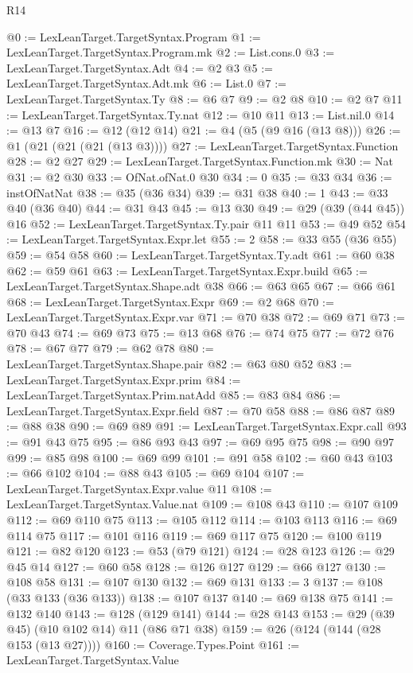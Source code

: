 \begin{lexlean}{R14}
\begin{coremodule}
{{{{{{{{{{{{@0 := LexLeanTarget.TargetSyntax.Program
@1 := LexLeanTarget.TargetSyntax.Program.mk
@2 := List.cons.{0}
@3 := LexLeanTarget.TargetSyntax.Adt
@4 := @2 @3
@5 := LexLeanTarget.TargetSyntax.Adt.mk
@6 := List.{0}
@7 := LexLeanTarget.TargetSyntax.Ty
@8 := @6 @7
@9 := @2 @8
@10 := @2 @7
@11 := LexLeanTarget.TargetSyntax.Ty.nat
@12 := @10 @11
@13 := List.nil.{0}
@14 := @13 @7
@16 := @12 (@12 @14)
@21 := @4 (@5 (@9 @16 (@13 @8)))
@26 := @1 (@21 (@21 (@21 (@13 @3))))
@27 := LexLeanTarget.TargetSyntax.Function
@28 := @2 @27
@29 := LexLeanTarget.TargetSyntax.Function.mk
@30 := Nat
@31 := @2 @30
@33 := OfNat.ofNat.{0} @30
@34 := 0
@35 := @33 @34
@36 := instOfNatNat
@38 := @35 (@36 @34)
@39 := @31 @38
@40 := 1
@43 := @33 @40 (@36 @40)
@44 := @31 @43
@45 := @13 @30
@49 := @29 (@39 (@44 @45)) @16
@52 := LexLeanTarget.TargetSyntax.Ty.pair @11 @11
@53 := @49 @52
@54 := LexLeanTarget.TargetSyntax.Expr.let
@55 := 2
@58 := @33 @55 (@36 @55)
@59 := @54 @58
@60 := LexLeanTarget.TargetSyntax.Ty.adt
@61 := @60 @38
@62 := @59 @61
@63 := LexLeanTarget.TargetSyntax.Expr.build
@65 := LexLeanTarget.TargetSyntax.Shape.adt @38
@66 := @63 @65
@67 := @66 @61
@68 := LexLeanTarget.TargetSyntax.Expr
@69 := @2 @68
@70 := LexLeanTarget.TargetSyntax.Expr.var
@71 := @70 @38
@72 := @69 @71
@73 := @70 @43
@74 := @69 @73
@75 := @13 @68
@76 := @74 @75
@77 := @72 @76
@78 := @67 @77
@79 := @62 @78
@80 := LexLeanTarget.TargetSyntax.Shape.pair
@82 := @63 @80 @52
@83 := LexLeanTarget.TargetSyntax.Expr.prim
@84 := LexLeanTarget.TargetSyntax.Prim.natAdd
@85 := @83 @84
@86 := LexLeanTarget.TargetSyntax.Expr.field
@87 := @70 @58
@88 := @86 @87
@89 := @88 @38
@90 := @69 @89
@91 := LexLeanTarget.TargetSyntax.Expr.call
@93 := @91 @43 @75
@95 := @86 @93 @43
@97 := @69 @95 @75
@98 := @90 @97
@99 := @85 @98
@100 := @69 @99
@101 := @91 @58
@102 := @60 @43
@103 := @66 @102
@104 := @88 @43
@105 := @69 @104
@107 := LexLeanTarget.TargetSyntax.Expr.value @11
@108 := LexLeanTarget.TargetSyntax.Value.nat
@109 := @108 @43
@110 := @107 @109
@112 := @69 @110 @75
@113 := @105 @112
@114 := @103 @113
@116 := @69 @114 @75
@117 := @101 @116
@119 := @69 @117 @75
@120 := @100 @119
@121 := @82 @120
@123 := @53 (@79 @121)
@124 := @28 @123
@126 := @29 @45 @14
@127 := @60 @58
@128 := @126 @127
@129 := @66 @127
@130 := @108 @58
@131 := @107 @130
@132 := @69 @131
@133 := 3
@137 := @108 (@33 @133 (@36 @133))
@138 := @107 @137
@140 := @69 @138 @75
@141 := @132 @140
@143 := @128 (@129 @141)
@144 := @28 @143
@153 := @29 (@39 @45) (@10 @102 @14) @11 (@86 @71 @38)
@159 := @26 (@124 (@144 (@28 @153 (@13 @27))))
@160 := Coverage.Types.Point
@161 := LexLeanTarget.TargetSyntax.Value
}}}}}}}}}}}}
\end{coremodule}
\end{lexlean}
